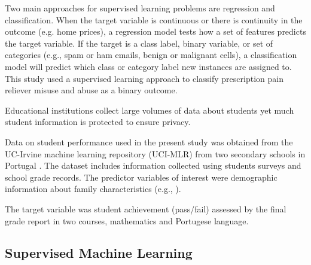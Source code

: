 \documentclass[sigconf]{acmart}
\begin{document}
Two main approaches for supervised learning 
problems are regression and classification. When the target variable
is continuous or there is continuity in the outcome (e.g. home prices), a 
regression model tests how a set of features predicts the target variable. 
If the target is a class label, binary variable, or set of categories 
(e.g., spam or ham emails, benign or malignant cells), a classification model 
will predict which class or category label new instances are assigned to. 
This study used a supervised learning approach to classify prescription pain
reliever misuse and abuse as a binary outcome. 


Educational institutions collect large volumes of data about students yet 
much student information is protected to ensure privacy. 

Data on student performance used in the present study was obtained from the
UC-Irvine machine learning repository (UCI-MLR) from two secondary schools 
in Portugal \cite{cortez09}. The dataset includes information collected using
students surveys and school grade records. The predictor variables of interest
were demographic information about family characteristics (e.g., ).

The target variable was student achievement (pass/fail) assessed by the 
final grade report in two courses, mathematics and Portugese language. 




\subsection{Supervised Machine Learning} 
\end{document}
